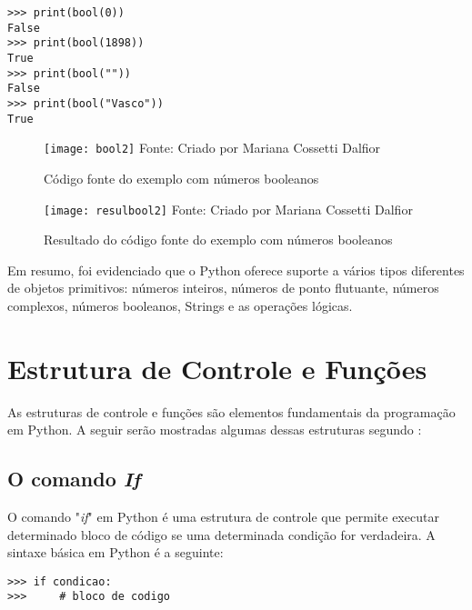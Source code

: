 \begin{lstlisting}
>>> print(bool(0))       
False
>>> print(bool(1898))       
True
>>> print(bool(""))      
False
>>> print(bool("Vasco")) 
True
\end{lstlisting}

\begin{figure}[H]
	\begin{center}
		\caption{C\'{o}digo fonte do exemplo com n\'{u}meros booleanos} \label{fontebool2}
		\texttt{[image: bool2]} 
		\newline
		Fonte: Criado por Mariana Cossetti Dalfior
	\end{center}
\end{figure}

\begin{figure}[H]
	\begin{center}
		\caption{Resultado do c\'{o}digo fonte do exemplo com n\'{u}meros booleanos} \label{resulbool2}
		\texttt{[image: resulbool2]} 
		\newline
		Fonte: Criado por Mariana Cossetti Dalfior
	\end{center}
\end{figure}

Em resumo, foi evidenciado que o Python oferece suporte a v\'{a}rios tipos diferentes de objetos primitivos: n\'{u}meros inteiros, n\'{u}meros de ponto flutuante, n\'{u}meros complexos, n\'{u}meros booleanos, Strings e as opera\c{c}\~{o}es l\'{o}gicas.

    \section{Estrutura de Controle e Fun\c{c}\~{o}es}
As estruturas de controle e fun\c{c}\~{o}es s\~{a}o elementos fundamentais da programa\c{c}\~{a}o em Python. A seguir ser\~{a}o mostradas algumas dessas estruturas segundo \cite{Guttag2021}: 
            \subsection{O comando \textsl{If}}
O comando "\textsl{if}" em Python \'{e} uma estrutura de controle que permite executar determinado bloco de c\'{o}digo se uma determinada condi\c{c}\~{a}o for verdadeira. A sintaxe b\'{a}sica em Python \'{e} a seguinte:
\begin{lstlisting}
>>> if condicao:
>>> 	# bloco de codigo
\end{lstlisting}	

